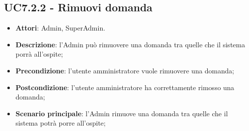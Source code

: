 \documentclass[../AnalisiDeiRequisiti_v4.0.0.tex]{subfiles}
\begin{document}
\subsection{UC7.2.2 - Rimuovi domanda} 
\label{sssec:UC7.2.2} 
\begin{itemize} 
\item \textbf{Attori}: Admin, SuperAdmin.
\item \textbf{Descrizione}: l'Admin può rimuovere una domanda tra quelle che il sistema porrà all'ospite;
\item \textbf{Precondizione}: l'utente amministratore vuole rimuovere una domanda;
\item \textbf{Postcondizione}: l'utente amministratore ha correttamente rimosso una domanda;
\item \textbf{Scenario principale}: l'Admin rimuove una domanda tra quelle che il sistema potrà porre all'ospite;
\end{itemize} 
\newpage
\end{document}
